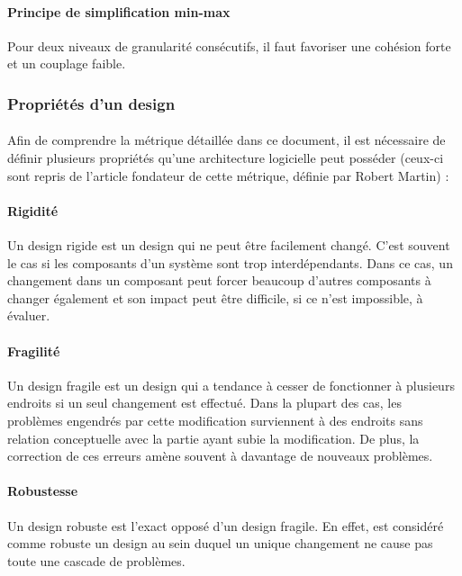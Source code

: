 \documentclass{scrartcl}
\begin{document}
    \paragraph{Principe de simplification min-max}Pour deux niveaux de granularité consécutifs, il faut favoriser une cohésion forte et un couplage faible.

\subsubsection{Propriétés d'un design}

    \paragraph{}Afin de comprendre la métrique détaillée dans ce document, il est nécessaire de définir plusieurs propriétés qu'une architecture logicielle peut posséder (ceux-ci sont repris de l'article fondateur de cette métrique, définie par Robert Martin\cite{Martin:1994}) :

    \paragraph{Rigidité}Un design rigide est un design qui ne peut être facilement changé. C'est souvent le cas si les composants d'un système sont trop interdépendants. Dans ce cas, un changement dans un composant peut forcer beaucoup d'autres composants à changer également et son impact peut être difficile, si ce n'est impossible, à évaluer.

    \paragraph{Fragilité}Un design fragile est un design qui a tendance à cesser de fonctionner à plusieurs endroits si un seul changement est effectué. Dans la plupart des cas, les problèmes engendrés par cette modification surviennent à des endroits sans relation conceptuelle avec la partie ayant subie la modification. De plus, la correction de ces erreurs amène souvent à davantage de nouveaux problèmes.

    \paragraph{Robustesse}Un design robuste est l'exact opposé d'un design fragile. En effet, est considéré comme robuste un design au sein duquel un unique changement ne cause pas toute une cascade de problèmes.
\end{document}
